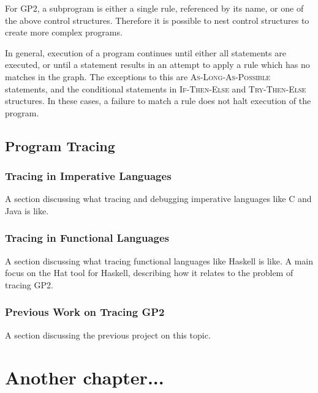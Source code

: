 \documentclass[authoryearcitations]{UoYCSproject}
\begin{document}
For GP2, a subprogram is either a single rule, referenced by its name, or one of
the above control structures. Therefore it is possible to nest control structures
to create more complex programs.

In general, execution of a program continues until either all statements are
executed, or until a statement results in an attempt to apply a rule which has
no matches in the graph. The exceptions to this are \textsc{As-Long-As-Possible}
statements, and the conditional statements in \textsc{If-Then-Else} and
\textsc{Try-Then-Else} structures. In these cases, a failure to match a rule
does not halt execution of the program.


\section{Program Tracing}
\label{sec:ProgramTracing}


\subsection{Tracing in Imperative Languages}
\label{sec:TracingInImperativeLanguages}

A section discussing what tracing and debugging imperative languages like C and
Java is like.


\subsection{Tracing in Functional Languages}
\label{sec:TracingInFunctionalLanguages}

A section discussing what tracing functional languages like Haskell is like. A
main focus on the Hat tool for Haskell, describing how it relates to the
problem of tracing GP2.


\subsection{Previous Work on Tracing GP2}
\label{sec:PreviousWorkOnTracingGP2}

A section discussing the previous project \citep{taylor2016} on this topic.



\clearpage

\chapter{Another chapter...}



\clearpage


\end{document}
